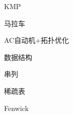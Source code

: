 \documentclass{article}
\begin{document}
\begin{enumerate}
	

{\bf \LARGE \item  数据结构}

	\begin{itemize}
	
	{\bf \item 串列}
		
	
	{\bf \item 稀疏表}
				
	
	{\bf \item Fenwick}
	
	
	\end{itemize}



\end{enumerate}
\end{document}
